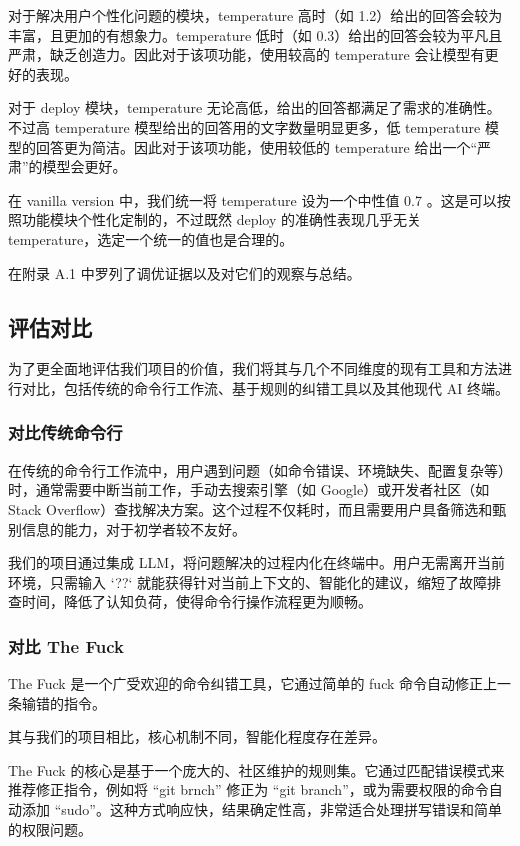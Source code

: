 \documentclass{article}
\theoremstyle{plain}
\theoremstyle{definition}
\theoremstyle{remark}
\begin{document}
对于解决用户个性化问题的模块，temperature 高时（如 1.2）给出的回答会较为丰富，且更加的有想象力。temperature 低时（如 0.3）给出的回答会较为平凡且严肃，缺乏创造力。因此对于该项功能，使用较高的 temperature 会让模型有更好的表现。

对于 deploy 模块，temperature 无论高低，给出的回答都满足了需求的准确性。不过高 temperature 模型给出的回答用的文字数量明显更多，低 temperature 模型的回答更为简洁。因此对于该项功能，使用较低的 temperature 给出一个“严肃”的模型会更好。

在 vanilla version 中，我们统一将 temperature 设为一个中性值 0.7 。这是可以按照功能模块个性化定制的，不过既然 deploy 的准确性表现几乎无关 temperature，选定一个统一的值也是合理的。

在附录 A.1 中罗列了调优证据以及对它们的观察与总结。

\subsection{评估对比}

为了更全面地评估我们项目的价值，我们将其与几个不同维度的现有工具和方法进行对比，包括传统的命令行工作流、基于规则的纠错工具以及其他现代 AI 终端。

\subsubsection{对比传统命令行}

在传统的命令行工作流中，用户遇到问题（如命令错误、环境缺失、配置复杂等）时，通常需要中断当前工作，手动去搜索引擎（如 Google）或开发者社区（如 Stack Overflow）查找解决方案。这个过程不仅耗时，而且需要用户具备筛选和甄别信息的能力，对于初学者较不友好。

我们的项目通过集成 LLM，将问题解决的过程内化在终端中。用户无需离开当前环境，只需输入 `??` 就能获得针对当前上下文的、智能化的建议，缩短了故障排查时间，降低了认知负荷，使得命令行操作流程更为顺畅。

\subsubsection{对比 The Fuck}

The Fuck 是一个广受欢迎的命令纠错工具，它通过简单的 fuck 命令自动修正上一条输错的指令。

其与我们的项目相比，核心机制不同，智能化程度存在差异。

The Fuck 的核心是基于一个庞大的、社区维护的规则集。它通过匹配错误模式来推荐修正指令，例如将 “git brnch” 修正为 “git branch”，或为需要权限的命令自动添加 “sudo”。这种方式响应快，结果确定性高，非常适合处理拼写错误和简单的权限问题。
\end{document}
